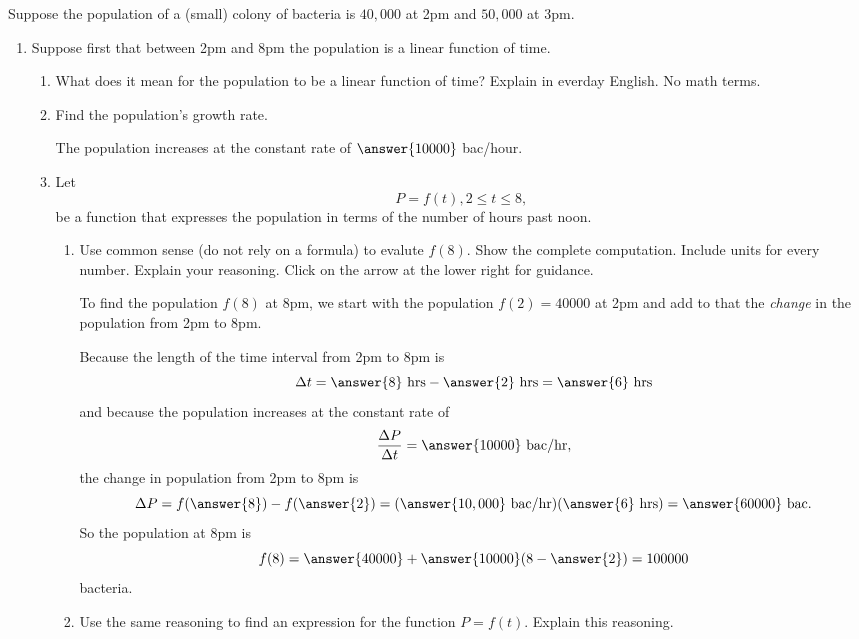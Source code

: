 \documentclass{ximera}
\begin{document}
\begin{example} \label{E567743344}
Suppose the population of a (small) colony of bacteria is $40,000$ at 2pm and $50,000$ at 3pm.

\begin{enumerate}

\item Suppose first that between 2pm and 8pm the population is a linear function of time.

\begin{enumerate}
\item What does it mean for the population to be a linear function of time? Explain in everday English. No math terms.

\item Find the population's growth rate.

The population increases at the constant rate of $\answer{10000}$ bac/hour.

\item Let 
\[
      P = f(t) , 2\leq t \leq 8 ,
\]
be a function that expresses the population in terms of the number of hours past noon.

\begin{enumerate}
\item Use common sense (do not rely on a formula) to evalute $f(8)$. Show the complete computation. Include units for every number. Explain your reasoning. Click on the arrow at the lower right for guidance.

\begin{expandable}
To find the population $f(8)$ at 8pm, we start with the population $f(2) = 40000$ at 2pm and add to that the \emph{change} in the population from 2pm to 8pm.

Because the length of the time interval from 2pm to 8pm is
\[
   \Delta t = \answer{8} \text{ hrs} - \answer{2}\text{ hrs} = \answer{6} \text{ hrs}
\]
and because the population increases at the constant rate of 
\[
  \frac{\Delta P}{\Delta t}  = \answer{10000} \text{ bac/hr} ,
\]
the change in population from 2pm to 8pm is
\[
  \Delta P = f(\answer{8}) - f(\answer{2}) = (\answer{10,000} \text{ bac/hr}) (\answer{6}\text{ hrs}) = \answer{60000}\text{ bac} . 
\]
So the population at 8pm is
\[
    f(8) = \answer{40000} + \answer{10000} ( 8 - \answer{2} ) = 100000
\]
bacteria.

\end{expandable}



\item Use the same reasoning to find an expression for the function $P=f(t)$. Explain this reasoning.
\end{enumerate}


\end{enumerate}
\end{enumerate}
\end{example}
\end{document}
